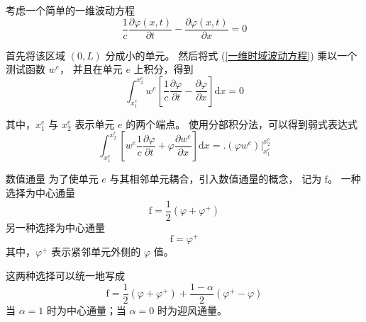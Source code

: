 \par 考虑一个简单的一维波动方程
\begin{equation}
    \frac{1}{c}\frac{\partial \varphi(x,t)}{\partial t}
    -\frac{\partial \varphi(x,t)}{\partial x}=0
    \label{一维时域波动方程}
\end{equation}
\par 首先将该区域 $(0,L)$ 分成小的单元。
然后将式 (\ref{一维时域波动方程}) 乘以一个测试函数 $w^e$，
并且在单元 $e$ 上积分，得到
\begin{equation}
    \int_{x_1^e}^{x_2^e}w^e\left[
        \frac{1}{c}\frac{\partial \varphi}{\partial t}
        -\frac{\partial \varphi}{\partial x}
    \right]\text{d}x=0
\end{equation}
\par 其中，$x_1^e$ 与 $x_2^e$ 表示单元 $e$ 的两个端点。
使用分部积分法，可以得到弱式表达式
\begin{equation}
    \int_{x_1^e}^{x_2^e}\left[
        w^e\frac{1}{c}\frac{\partial \varphi}{\partial t}
        +\varphi\frac{\partial w^e}{\partial x}
    \right]\text{d}x
    =\Big.(\varphi w^e)\Big|_{x_1^e}^{x_2^e}
    \label{一维时域波动方程弱式}
\end{equation}

\begin{definition}{数值通量}
    为了使单元 $e$ 与其相邻单元耦合，引入数值通量的概念，
    记为 $\text{f}$。
    一种选择为中心通量
    \begin{equation}
        \text{f}=\frac{1}{2}(\varphi+\varphi^+)
    \end{equation}
    另一种选择为中心通量
    \begin{equation}
        \text{f}=\varphi^+
    \end{equation}
    其中，$\varphi^+$ 表示紧邻单元外侧的 $\varphi$ 值。

    这两种选择可以统一地写成
    \begin{equation}
        \text{f}=\frac{1}{2}(\varphi+\varphi^+)
        +\frac{1-\alpha}{2}(\varphi^+-\varphi)
    \end{equation}
    当 $\alpha=1$ 时为中心通量；当 $\alpha=0$ 时为迎风通量。
\end{definition}

